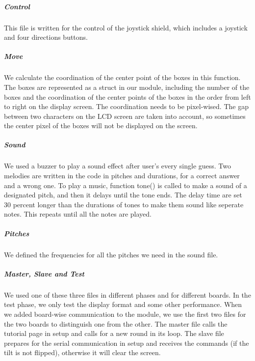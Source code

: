 \subparagraph{Control}
\hfill \newline
This file is written for the control of the joystick shield, which includes a joystick and four directions buttons.

\subparagraph{Move}
\hfill \newline
We calculate the coordination of the center point of the boxes in this function. The boxes are represented as a struct in our module, including the number of the boxes and the coordination of the center points of the boxes in the order from left to right on the display screen. The coordination needs to be pixel-wised. The gap between two characters on the LCD screen are taken into account, so sometimes the center pixel of the boxes will not be displayed on the screen.

\subparagraph{Sound}
\hfill \newline
We used a buzzer to play a sound effect after user's every single guess. Two melodies are written in the code in pitches and durations, for a correct answer and a wrong one. To play a music, function tone() is called to make a sound of a designated pitch, and then it delays until the tone ends. The delay time are set 30 percent longer than the durations of tones to make them sound like seperate notes. This repeats until all the notes are played.

\subparagraph{Pitches}
\hfill \newline
We defined the frequencies for all the pitches we need in the sound file.

\subparagraph{Master, Slave and Test}
\hfill \newline
We used one of these three files in different phases and for different boards. In the test phase, we only test the display format and some other performance. When we added board-wise communication to the module, we use the first two files for the two boards to distinguish one from the other. The master file calls the tutorial page in setup and calls for a new round in its loop. The slave file prepares for the serial communication in setup and receives the commands (if the tilt is not flipped), otherwise it will clear the screen.

